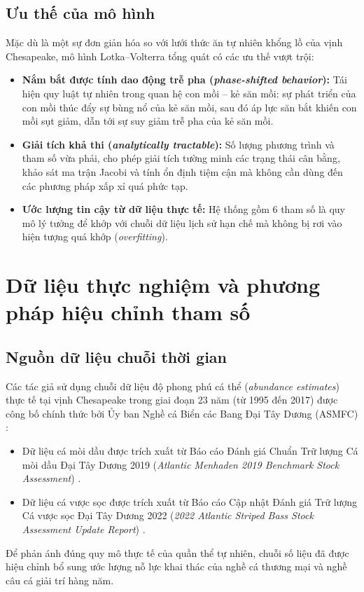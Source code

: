 \subsection{Ưu thế của mô hình}
Mặc dù là một sự đơn giản hóa so với lưới thức ăn tự nhiên khổng lồ của vịnh Chesapeake, mô hình Lotka--Volterra tổng quát có các ưu thế vượt trội:
\begin{itemize}
    \item \textbf{Nắm bắt được tính dao động trễ pha (\textit{phase-shifted behavior}):} Tái hiện quy luật tự nhiên trong quan hệ con mồi -- kẻ săn mồi: sự phát triển của con mồi thúc đẩy sự bùng nổ của kẻ săn mồi, sau đó áp lực săn bắt khiến con mồi sụt giảm, dẫn tới sự suy giảm trễ pha của kẻ săn mồi.
    \item \textbf{Giải tích khả thi (\textit{analytically tractable}):} Số lượng phương trình và tham số vừa phải, cho phép giải tích tường minh các trạng thái cân bằng, khảo sát ma trận Jacobi và tính ổn định tiệm cận mà không cần dùng đến các phương pháp xấp xỉ quá phức tạp.
    \item \textbf{Ước lượng tin cậy từ dữ liệu thực tế:} Hệ thống gồm 6 tham số là quy mô lý tưởng để khớp với chuỗi dữ liệu lịch sử hạn chế mà không bị rơi vào hiện tượng quá khớp (\textit{overfitting}).
\end{itemize}

\section{Dữ liệu thực nghiệm và phương pháp hiệu chỉnh tham số}
\label{sec:model_data}

\subsection{Nguồn dữ liệu chuỗi thời gian}
Các tác giả sử dụng chuỗi dữ liệu độ phong phú cá thể (\textit{abundance estimates}) thực tế tại vịnh Chesapeake trong giai đoạn 23 năm (từ 1995 đến 2017) được công bố chính thức bởi Ủy ban Nghề cá Biển các Bang Đại Tây Dương (ASMFC) \cite{asmfc2022stock}:
\begin{itemize}
    \item Dữ liệu cá mòi dầu được trích xuất từ Báo cáo Đánh giá Chuẩn Trữ lượng Cá mòi dầu Đại Tây Dương 2019 (\textit{Atlantic Menhaden 2019 Benchmark Stock Assessment}) \cite{sedar2020menhaden}.
    \item Dữ liệu cá vược sọc được trích xuất từ Báo cáo Cập nhật Đánh giá Trữ lượng Cá vược sọc Đại Tây Dương 2022 (\textit{2022 Atlantic Striped Bass Stock Assessment Update Report}) \cite{asmfc2022stock}.
\end{itemize}
Để phản ánh đúng quy mô thực tế của quần thể tự nhiên, chuỗi số liệu đã được hiệu chỉnh bổ sung ước lượng nỗ lực khai thác của nghề cá thương mại và nghề câu cá giải trí hàng năm.

